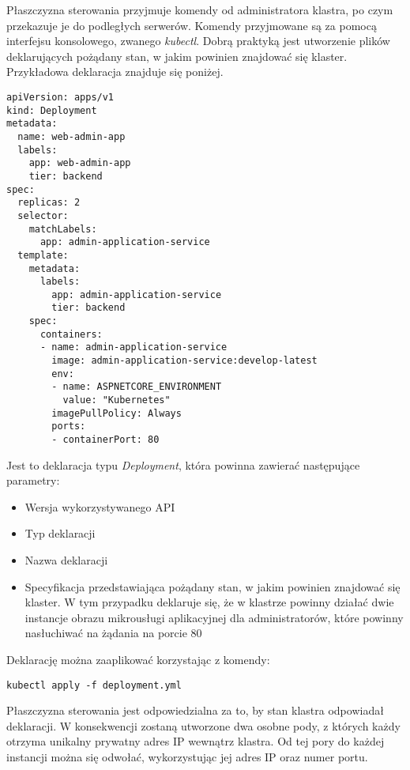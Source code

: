 Płaszczyzna sterowania przyjmuje komendy od administratora klastra, po czym przekazuje 
je do podległych serwerów. Komendy przyjmowane są za pomocą interfejsu 
konsolowego, zwanego \textit{kubectl}. Dobrą praktyką jest utworzenie plików deklarujących 
pożądany stan, w jakim powinien znajdować się klaster. Przykładowa deklaracja znajduje 
się poniżej.

\begin{lstlisting}
apiVersion: apps/v1
kind: Deployment
metadata:
  name: web-admin-app
  labels:
    app: web-admin-app
    tier: backend
spec:
  replicas: 2
  selector:
    matchLabels:
      app: admin-application-service
  template:
    metadata:
      labels:
        app: admin-application-service
        tier: backend
    spec:
      containers:
      - name: admin-application-service
        image: admin-application-service:develop-latest
        env:
        - name: ASPNETCORE_ENVIRONMENT
          value: "Kubernetes"
        imagePullPolicy: Always
        ports:
        - containerPort: 80

\end{lstlisting}

Jest to deklaracja typu \textit{Deployment}, która powinna zawierać następujące parametry:

\begin{itemize} %
    \item Wersja wykorzystywanego API
    \item Typ deklaracji
    \item Nazwa deklaracji
    \item Specyfikacja przedstawiająca pożądany stan, w jakim powinien znajdować się 
    klaster. W tym przypadku deklaruje się, że w klastrze powinny działać dwie 
    instancje obrazu mikrousługi aplikacyjnej dla administratorów, które powinny 
    nasłuchiwać na żądania na porcie 80
\end{itemize}

Deklarację można zaaplikować korzystając z komendy:

\begin{lstlisting}
kubectl apply -f deployment.yml
\end{lstlisting}

Płaszczyzna sterowania jest odpowiedzialna za to, by stan klastra odpowiadał 
deklaracji. W konsekwencji zostaną utworzone dwa osobne pody, z których każdy otrzyma 
unikalny prywatny adres IP wewnątrz klastra. Od tej pory do każdej instancji można 
się odwołać, wykorzystując jej adres IP oraz numer portu.

